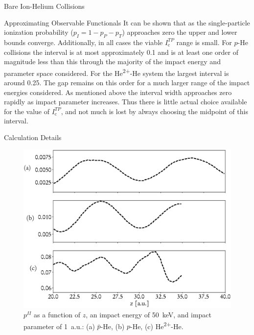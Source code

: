 \documentclass[letterpaper, 11 pt]{report}
\begin{document}
\begin{chapter}{Bare Ion-Helium Collisions \label{chap:p-he2p-he}}
\begin{section}{Approximating Observable Functionals \label{sec:phe2p-obs}}
      It can be shown that as the single-particle ionization probability ($p_I = 1 - p_P - p_T$)
      approaches zero the upper and lower bounds converge. Additionally, in all cases the viable
      $I_\mathrm{c}^{TP}$ range is small. For $p$-He collisions the interval is at most approximately
      0.1 and is at least one order of magnitude less than this through the majority of the impact
      energy and parameter space considered. For the He\textsuperscript{2+}-He system the largest
      interval is around 0.25. The gap remains on this order for a much larger range of the impact
      energies considered. As mentioned above the interval width approaches zero rapidly as impact
      parameter increases. Thus there is little actual choice available for the value of
      $I_\mathrm{c}^{TP}$, and not much is lost by always choosing the midpoint of this interval.

   \end{section}

   \begin{section}{Calculation Details \label{sec:phe2p-det}}

      \begin{figure}[t]
         \begin{minipage}{.49\linewidth}

            \centering
            \includegraphics[width = \linewidth]{./images/poz.eps}
            \caption[Probabilities as a function of nuclear separation.]{$p^{II}$ as a
                     function of $z$, an impact energy of 50~keV, and impact parameter of 1~a.u.:
                     (a) $\bar{p}$-He, (b) $p$-He, (c) He\textsuperscript{2+}-He. \label{fig:poz}}
         \end{minipage} \hspace{0.009\linewidth} %
         \begin{minipage}{.49\linewidth}


\end{minipage}
\end{figure}
\end{section}
\end{chapter}
\end{document}
